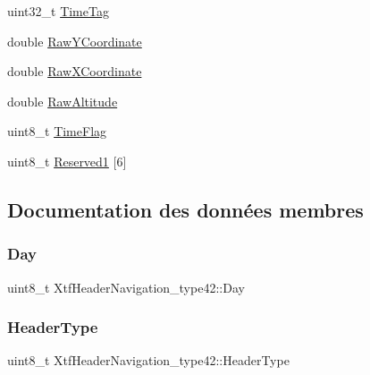 \begin{DoxyCompactItemize}
\item 
uint32\+\_\+t \hyperlink{structXtfHeaderNavigation__type42_acfee8cdd16d7c8cf60b7ac45063201d2}{Time\+Tag}
\item 
double \hyperlink{structXtfHeaderNavigation__type42_af9a5d74604bb99d0038debce509d439b}{Raw\+Y\+Coordinate}
\item 
double \hyperlink{structXtfHeaderNavigation__type42_a6937fe7ddbe379b406a5dc8c0e0abff7}{Raw\+X\+Coordinate}
\item 
double \hyperlink{structXtfHeaderNavigation__type42_a983c6ce2d445facd41f9730460dea053}{Raw\+Altitude}
\item 
uint8\+\_\+t \hyperlink{structXtfHeaderNavigation__type42_a4c21a09dc13268493d80343352ebe9fe}{Time\+Flag}
\item 
uint8\+\_\+t \hyperlink{structXtfHeaderNavigation__type42_a1acbbea606cb7213d43633fd6459da27}{Reserved1} \mbox{[}6\mbox{]}
\end{DoxyCompactItemize}


\subsection{Documentation des données membres}
\mbox{\label{structXtfHeaderNavigation__type42_a7c70b71cc00baad0a1bc00ecb129c024}} 
\subsubsection{\texorpdfstring{Day}{Day}}
{\footnotesize\ttfamily uint8\+\_\+t Xtf\+Header\+Navigation\+\_\+type42\+::\+Day}

\mbox{\label{structXtfHeaderNavigation__type42_ae1d4cf5c81e5531928d5a21995ff2ef9}} 
\subsubsection{\texorpdfstring{Header\+Type}{HeaderType}}
{\footnotesize\ttfamily uint8\+\_\+t Xtf\+Header\+Navigation\+\_\+type42\+::\+Header\+Type}

